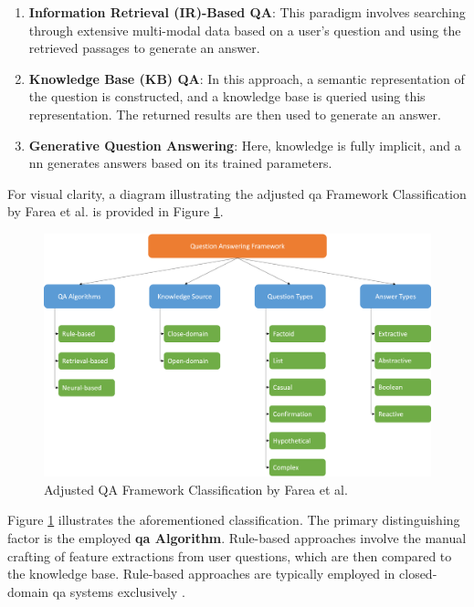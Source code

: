\begin{enumerate}
    \item \textbf{Information Retrieval (IR)-Based QA}: This paradigm involves searching through extensive multi-modal data based on a user's question and using the retrieved passages to generate an answer.
    
    \item \textbf{Knowledge Base (KB) QA}: In this approach, a semantic representation of the question is constructed, and a knowledge base is queried using this representation. The returned results are then used to generate an answer.
    
    \item \textbf{Generative Question Answering}: Here, knowledge is fully implicit, and a \gls{nn} generates answers based on its trained parameters.

\end{enumerate}

For visual clarity, a diagram illustrating the adjusted \gls{qa} Framework Classification by Farea et al. is provided in Figure \ref{fig:qa_classification}.

\begin{figure}[h]
    \centering
    \includegraphics[width=\textwidth]{Grafiken/QA_Framework.png}
    \caption{Adjusted QA Framework Classification by Farea et al. \cite{farea_evaluation_2022}}
    \label{fig:qa_classification}
\end{figure}


Figure \ref{fig:qa_classification} illustrates the aforementioned classification. The primary distinguishing factor is the employed \textbf{\gls{qa} Algorithm}. Rule-based approaches involve the manual crafting of feature extractions from user questions, which are then compared to the knowledge base. Rule-based approaches are typically employed in closed-domain \gls{qa} systems exclusively \cite{etezadi_state_2023}.

